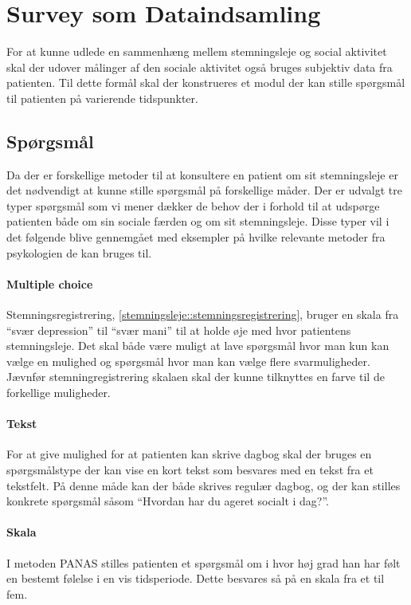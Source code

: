 \section{Survey som Dataindsamling}
For at kunne udlede en sammenhæng mellem stemningsleje og social aktivitet skal der udover målinger af den sociale aktivitet også bruges subjektiv data fra patienten.
Til dette formål skal der konstrueres et modul der kan stille spørgsmål til patienten på varierende tidspunkter.

\subsection{Spørgsmål}\label{survey:spg}
Da der er forskellige metoder til at konsultere en patient om sit stemningsleje er det nødvendigt at kunne stille spørgsmål på forskellige måder.
Der er udvalgt tre typer spørgsmål som vi mener dækker de behov der i forhold til at udspørge patienten både om sin sociale færden og om sit stemningsleje.
Disse typer vil i det følgende blive gennemgået med eksempler på hvilke relevante metoder fra psykologien de kan bruges til.

\paragraph{Multiple choice}
Stemningsregistrering, \cref{stemningsleje::stemningsregistrering}, bruger en skala fra ``svær depression'' til ``svær mani'' til at holde øje med hvor patientens stemningsleje.
Det skal både være muligt at lave spørgsmål hvor man kun kan vælge en mulighed og spørgsmål hvor man kan vælge flere svarmuligheder.
Jævnfør stemningregistrering skalaen skal der kunne tilknyttes en farve til de forkellige muligheder.


\paragraph{Tekst}
For at give mulighed for at patienten kan skrive dagbog  skal der bruges en spørgsmålstype der kan vise en kort tekst som besvares med en tekst fra et tekstfelt.
På denne måde kan der både skrives regulær dagbog, og der kan stilles konkrete spørgsmål såsom ``Hvordan har du ageret socialt i dag?''.

\paragraph{Skala}
I metoden PANAS stilles patienten et spørgsmål om i hvor høj grad han har følt en bestemt følelse i en vis tidsperiode.
Dette besvares så på en skala fra et til fem.


